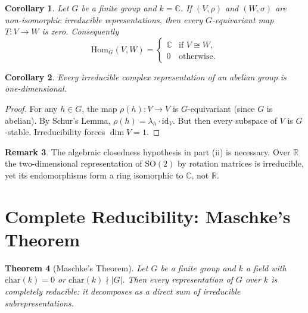 \documentclass[12pt,a4paper]{amsart}
\newtheorem{theorem}{Theorem}[section]
\newtheorem{corollary}[theorem]{Corollary}
\theoremstyle{definition}
\newtheorem{remark}[theorem]{Remark}
\begin{document}
\begin{corollary}
\label{cor:schur_decomp}
Let $G$ be a finite group and $k = \mathbb{C}$.  If $(V,\rho)$ and $(W,\sigma)$
are non-isomorphic irreducible representations, then every $G$-equivariant map
$T \colon V \to W$ is zero.  Consequently
\[
    \mathrm{Hom}_G(V,W) = \begin{cases} \mathbb{C} & \text{if } V \cong W, \\ 0 & \text{otherwise.} \end{cases}
\]
\end{corollary}

\begin{corollary}
Every irreducible complex representation of an abelian group is one-dimensional.
\end{corollary}

\begin{proof}
For any $h \in G$, the map $\rho(h) \colon V \to V$ is $G$-equivariant (since $G$
is abelian).  By Schur's Lemma, $\rho(h) = \lambda_h \cdot \mathrm{id}_V$.  But
then every subspace of $V$ is $G$-stable.  Irreducibility forces $\dim V = 1$.
\end{proof}

\begin{remark}
The algebraic closedness hypothesis in part (ii) is necessary.  Over $\mathbb{R}$
the two-dimensional representation of $\mathrm{SO}(2)$ by rotation matrices is
irreducible, yet its endomorphisms form a ring isomorphic to $\mathbb{C}$, not
$\mathbb{R}$.
\end{remark}

\section{Complete Reducibility: Maschke's Theorem}
\label{sec:maschke}

\begin{theorem}[Maschke's Theorem]
\label{thm:maschke}
Let $G$ be a finite group and $k$ a field with $\mathrm{char}(k) = 0$ or
$\mathrm{char}(k) \nmid |G|$.  Then every representation of $G$ over $k$ is
\emph{completely reducible}: it decomposes as a direct sum of irreducible
subrepresentations.
\end{theorem}
\end{document}
